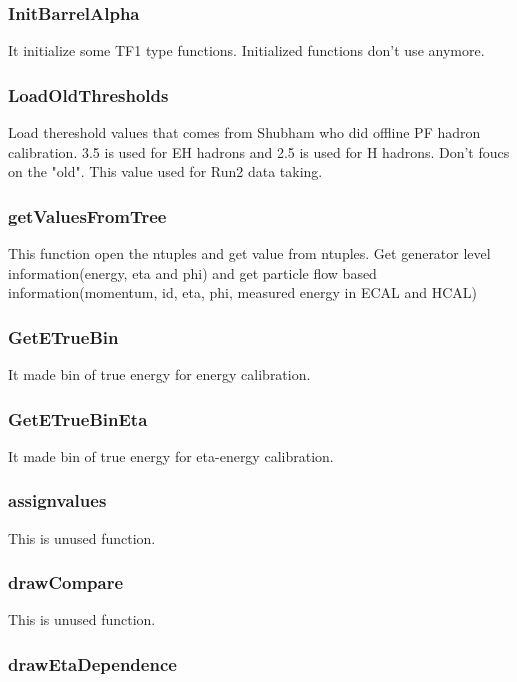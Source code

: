 \documentclass{cernrep}
\begin{document}
\subsubsection{InitBarrelAlpha}

It initialize some TF1 type functions. Initialized functions don't use anymore.

\subsubsection {LoadOldThresholds}

Load thereshold values that comes from Shubham who did offline PF hadron calibration. 3.5 is used for EH hadrons and 2.5 is used for H hadrons. Don't foucs on the "old". This value used for Run2 data taking.

\subsubsection {getValuesFromTree}
This function open the ntuples and get value from ntuples. Get generator level information(energy, eta and phi) and get particle flow based information(momentum, id, eta, phi, measured energy in ECAL and HCAL)


\subsubsection {GetETrueBin}

It made bin of true energy for energy calibration.

\subsubsection {GetETrueBinEta}

It made bin of true energy for eta-energy calibration.

\subsubsection {assignvalues}

This is unused function.

\subsubsection {drawCompare}

This is unused function.

\subsubsection {drawEtaDependence}
\end{document}
